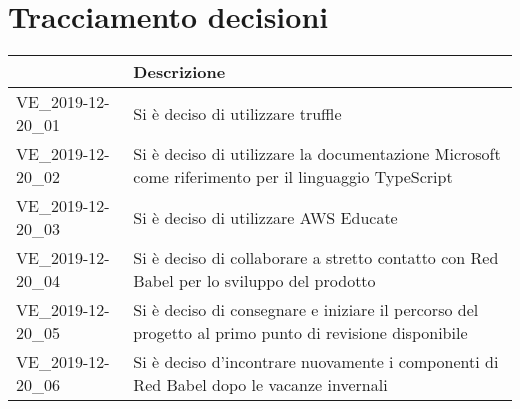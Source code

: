 \section{Tracciamento decisioni}
\renewcommand{\arraystretch}{1.8}

  \begin{longtable}{|p{5cm}|p{9cm}|}
    \hline

    \rowcolor{header}
    \centering{\textbf{Codice}} &  \textbf{Descrizione}\\

    \hline

    VE\_2019-12-20\_01 & Si è deciso di utilizzare truffle  \\
    VE\_2019-12-20\_02 & Si è deciso di utilizzare la documentazione Microsoft come riferimento per il linguaggio TypeScript\\
    VE\_2019-12-20\_03 & Si è deciso di utilizzare AWS Educate\\
    VE\_2019-12-20\_04 & Si è deciso di collaborare a stretto contatto con Red Babel per lo sviluppo del prodotto\\
    VE\_2019-12-20\_05 & Si è deciso di consegnare e iniziare il percorso del progetto al primo punto di revisione disponibile\\
    VE\_2019-12-20\_06 & Si è deciso d'incontrare nuovamente i componenti di Red Babel dopo le vacanze invernali\\
    \hline
  \end{longtable}
